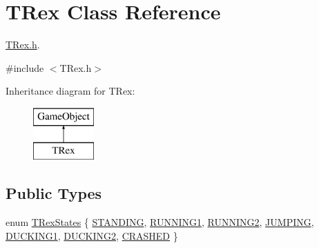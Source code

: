 \hypertarget{class_t_rex}{}\section{T\+Rex Class Reference}
\label{class_t_rex}


\mbox{\hyperlink{_t_rex_8h}{T\+Rex.\+h}}.  




{\ttfamily \#include $<$T\+Rex.\+h$>$}

Inheritance diagram for T\+Rex\+:\begin{figure}[H]
\begin{center}
\leavevmode
\includegraphics[height=2.000000cm]{class_t_rex}
\end{center}
\end{figure}
\subsection*{Public Types}
\begin{DoxyCompactItemize}
\item 
enum \mbox{\hyperlink{class_t_rex_a000c4d51b41f07886af073a6b7b3e063}{T\+Rex\+States}} \{ \newline
\mbox{\hyperlink{class_t_rex_a000c4d51b41f07886af073a6b7b3e063a9ec81d92b8dc4fcd068d79fc9a4f8852}{S\+T\+A\+N\+D\+I\+NG}}, 
\mbox{\hyperlink{class_t_rex_a000c4d51b41f07886af073a6b7b3e063a00c744a923cae00b93dce9066ac5d78e}{R\+U\+N\+N\+I\+N\+G1}}, 
\mbox{\hyperlink{class_t_rex_a000c4d51b41f07886af073a6b7b3e063a45c1501ee5ef07c50fd8cdb9c54438cc}{R\+U\+N\+N\+I\+N\+G2}}, 
\mbox{\hyperlink{class_t_rex_a000c4d51b41f07886af073a6b7b3e063a18c64ccfa932ce5bd90d55c371061af5}{J\+U\+M\+P\+I\+NG}}, 
\newline
\mbox{\hyperlink{class_t_rex_a000c4d51b41f07886af073a6b7b3e063a0945980c3cb225bcd4792583d520c296}{D\+U\+C\+K\+I\+N\+G1}}, 
\mbox{\hyperlink{class_t_rex_a000c4d51b41f07886af073a6b7b3e063a7e2f96e3d33e2d13ed89f82305c5d77d}{D\+U\+C\+K\+I\+N\+G2}}, 
\mbox{\hyperlink{class_t_rex_a000c4d51b41f07886af073a6b7b3e063a41e6190dc9df5d761648b688111d8bcc}{C\+R\+A\+S\+H\+ED}}
 \}
\end{DoxyCompactItemize}
